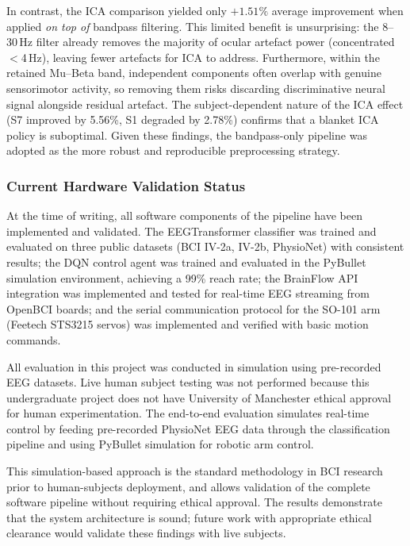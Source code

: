 \documentclass[12pt, a4paper]{article}
\begin{document}
In contrast, the ICA comparison yielded only $+1.51\%$ average improvement when applied \emph{on top of} bandpass filtering. This limited benefit is unsurprising: the 8--30\,Hz filter already removes the majority of ocular artefact power (concentrated $<$4\,Hz), leaving fewer artefacts for ICA to address. Furthermore, within the retained Mu--Beta band, independent components often overlap with genuine sensorimotor activity, so removing them risks discarding discriminative neural signal alongside residual artefact. The subject-dependent nature of the ICA effect (S7 improved by 5.56\%, S1 degraded by 2.78\%) confirms that a blanket ICA policy is suboptimal. Given these findings, the bandpass-only pipeline was adopted as the more robust and reproducible preprocessing strategy.

\subsubsection{Current Hardware Validation Status}

At the time of writing, all software components of the pipeline have been implemented and validated. The EEGTransformer classifier was trained and evaluated on three public datasets (BCI IV-2a, IV-2b, PhysioNet) with consistent results; the DQN control agent was trained and evaluated in the PyBullet simulation environment, achieving a 99\% reach rate; the BrainFlow API integration was implemented and tested for real-time EEG streaming from OpenBCI boards; and the serial communication protocol for the SO-101 arm (Feetech STS3215 servos) was implemented and verified with basic motion commands.

All evaluation in this project was conducted in simulation using pre-recorded EEG datasets. Live human subject testing was not performed because this undergraduate project does not have University of Manchester ethical approval for human experimentation. The end-to-end evaluation simulates real-time control by feeding pre-recorded PhysioNet EEG data through the classification pipeline and using PyBullet simulation for robotic arm control.

This simulation-based approach is the standard methodology in BCI research prior to human-subjects deployment, and allows validation of the complete software pipeline without requiring ethical approval. The results demonstrate that the system architecture is sound; future work with appropriate ethical clearance would validate these findings with live subjects.
\end{document}
